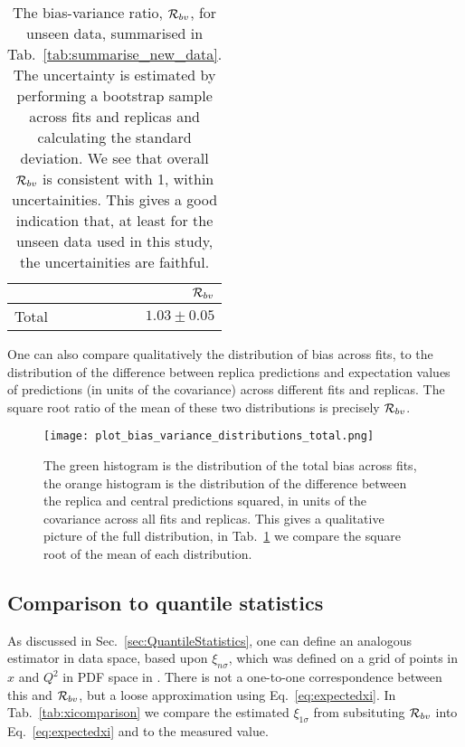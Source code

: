 \begin{table}[hb]
    \begin{center}
        \begin{tabular}{lr}
            \toprule
            {}     &  $\mathcal{R}_{bv}$ \\
            \midrule
            Total  &  $1.03\pm0.05$   \\
            \bottomrule
            \end{tabular}
    \end{center}
    \caption{
        The bias-variance ratio, $\mathcal{R}_{bv}$, for unseen data, summarised in
        Tab.~\ref{tab:summarise_new_data}. The uncertainty is estimated by
        performing a bootstrap sample across fits and replicas and calculating
        the standard deviation. We see that overall $\mathcal{R}_{bv}$ is consistent
        with 1, within uncertainities. This gives a good indication that, at least
        for the unseen data used in this study, the uncertainities are faithful.
    }
    \label{tab:biasvarratio}
\end{table}

One can also compare qualitatively the distribution of bias across fits, to the
distribution of the difference between replica predictions and expectation
values of predictions (in units of the covariance) across different fits
and replicas. The square root ratio of the mean of these two distributions
is precisely $\mathcal{R}_{bv}$.

\begin{figure}[ht]
    \centering
    \texttt{[image: plot\_bias\_variance\_distributions\_total.png]}
    \caption{The green histogram is the distribution of the total bias across fits,
    the orange histogram is the distribution of the difference between the
    replica and central predictions squared, in units of the covariance
    across all fits and replicas. This gives a qualitative picture of the full
    distribution, in Tab.~\ref{tab:biasvarratio} we compare the square root of the
    mean of each distribution.}
\end{figure}

\subsection{Comparison to quantile statistics}

As discussed in Sec.~\ref{sec:QuantileStatistics}, one can define an analogous
estimator in data space, based upon $\xi_{n\sigma}$, which was defined on a grid
of points in $x$ and $Q^2$ in PDF space in \cite{nnpdf30}. There is not
a one-to-one correspondence
between this and $\mathcal{R}_{bv}$, but a loose approximation using
Eq.~\ref{eq:expectedxi}. In Tab.~\ref{tab:xicomparison} we compare the estimated
$\xi_{1\sigma}$ from
subsituting $\mathcal{R}_{bv}$ into Eq.~\ref{eq:expectedxi} and to the
measured value.

